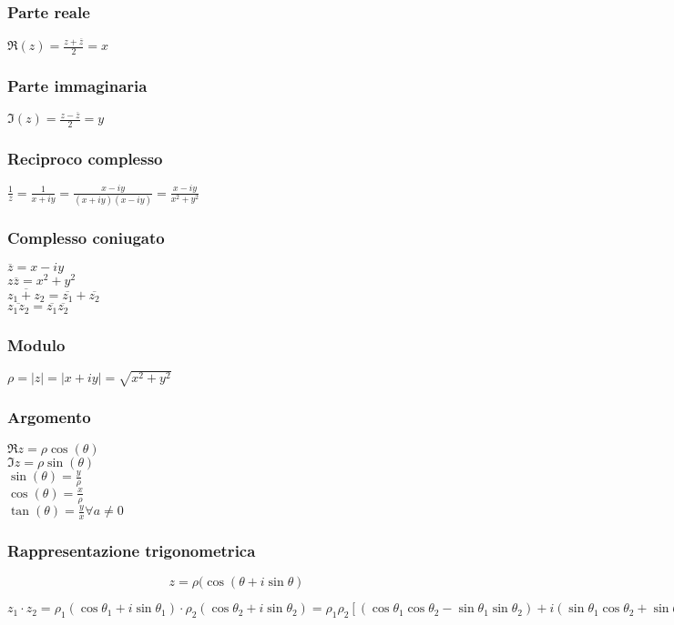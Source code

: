 \documentclass[a4paper,12pt]{article}
\theoremstyle{mystyle}
\begin{document}
\subsubsection{Parte reale}
\(\Re (z) = \frac{z + \overline{z}}{2} =x \)

\subsubsection{Parte immaginaria}
\(\Im  (z) = \frac{z - \overline{z}}{2} = y \)


\subsubsection{Reciproco complesso}
\(\frac{1}{z} = \frac{1}{x+iy} = \frac{x-iy}{(x+iy)(x-iy)} = \frac{x-iy}{x^2+y^2} \)

\subsubsection{Complesso coniugato}
\(\overline z = x-iy \)\\
\(z \overline z = x^2 + y^2 \)\\
\(\overline{z_1+z_2} = \overline {z_1} + \overline {z_2} \)\\
\(\overline {z_1 z_2} = \overline {z_1} \overline {z_2} \)

\subsubsection{Modulo}
\(\rho =\lvert z \rvert = \lvert x + iy \rvert = \sqrt{x^2 + y^2}\)

\subsubsection{Argomento}
\(\Re z = \rho \cos (\theta) \)\\
\(\Im z = \rho \sin (\theta) \)\\
\(\sin (\theta) =\frac{y}{\rho} \)\\
\(\cos (\theta) = \frac{x}{\rho} \)\\
\(\tan (\theta) = \frac{y}{x} \forall a \neq 0 \)

\subsubsection{Rappresentazione trigonometrica}
\[z= \rho(\cos(\theta + i \sin \theta) \]

\(z_1 \cdot z_2 = \rho_1 (\cos \theta_1 + i \sin \theta _1) \cdot \rho_2 (\cos \theta _2 + i \sin \theta _2 ) = \rho_1 \rho_2 [(\cos \theta_1 \cos \theta_2 - \sin \theta_1 \sin \theta_2)+i(\sin \theta_1 \cos \theta_2 + \sin \theta_2 \cos \theta_1)] =\rho_1 \rho_2 [\cos(\theta_1 + \theta_2) + i \sin(\theta_1 + \theta_2)] \)
\end{document}
